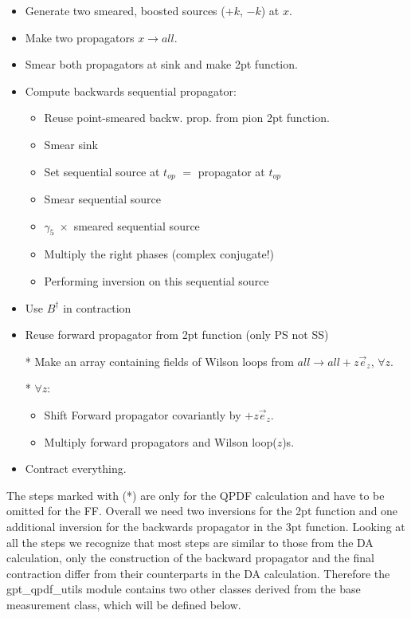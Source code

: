 \documentclass[a4paper,10pt]{scrartcl}
\begin{document}
\begin{itemize}
    \item Generate two smeared, boosted sources ($+k$, $-k$) at $x$.
    \item Make two propagators $x \to all$.
    \item Smear both propagators at sink and make 2pt function.
    \item Compute backwards sequential propagator:
    \begin{itemize}
        \item Reuse point-smeared backw. prop. from pion 2pt function.
        \item Smear sink
        \item Set sequential source at $t_{op}$ $=$ propagator at $t_{op}$
        \item Smear sequential source
        \item $\gamma_5 \; \times$ smeared sequential source
        \item Multiply the right phases (complex conjugate!)
        \item Performing inversion on this sequential source
    \end{itemize}
    \item Use $B^\dagger$ in contraction 
    \item Reuse forward propagator from 2pt function (only PS not SS)
    \item[*] Make an array containing fields of Wilson loops from $all \to all +z \vec e_z$, $\forall z$.
    \item[*] $\forall z$:
    \begin{itemize}
        \item Shift Forward propagator covariantly by $+z \vec e_z$.
        \item Multiply forward propagators and Wilson loop($z$)s.
    \end{itemize}
    \item Contract everything.
\end{itemize}
The steps marked with (*) are only for the QPDF calculation and have to be omitted for the FF. Overall we need two inversions for the 2pt function
and one additional inversion for the backwards propagator in the 3pt function. Looking at all the steps we recognize that 
most steps are similar to those from the DA calculation, only the construction of the backward propagator and the final contraction differ
from their counterparts in the DA calculation. Therefore the gpt\_qpdf\_utils module contains two other classes derived from the base measurement class,
which will be defined below. 
\end{document}

